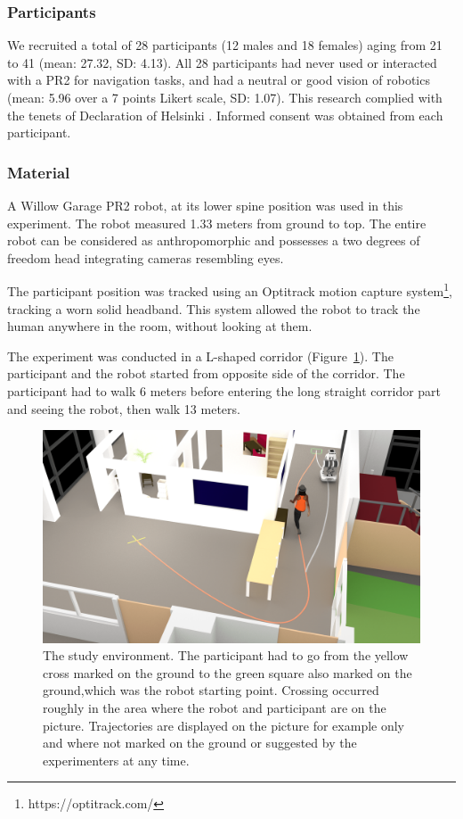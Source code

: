 \documentclass[a4paper,11pt,twoside]{StyleThese}
\begin{document}
\subsubsection{Participants}
We recruited a total of 28 participants (12 males and 18 females) aging from 21 to 41 (mean: 27.32, SD: 4.13). All 28 participants had never used or interacted with a PR2 for navigation tasks, and had a neutral or good vision of robotics (mean: 5.96 over a 7 points Likert scale, SD: 1.07). This research complied with the tenets of Declaration of Helsinki \cite{world2013world}. Informed consent was obtained from each participant.

\subsubsection{Material}
A Willow Garage PR2 robot, at its lower spine position was used in this experiment. The robot measured 1.33 meters from ground to top. The entire robot can be considered as anthropomorphic and possesses a two degrees of freedom head integrating cameras resembling eyes.

The participant position was tracked using an Optitrack motion capture system\footnote{https://optitrack.com/}, tracking a worn solid headband. This system allowed the robot to track the human anywhere in the room, without looking at them.

The experiment was conducted in a L-shaped corridor (Figure~\ref{fig:experiment_adream}). The participant and the robot started from opposite side of the corridor. The participant had to walk 6 meters before entering the long straight corridor part and seeing the robot, then walk 13 meters.

\begin{figure}[hbtp]
\centering
\includegraphics[width=\textwidth]{figures/chapter2/expe_human-min.png}
\caption{The  study  environment.  The  participant  had  to  go  from  the  yellow  cross  marked  on  the  ground  to  the  green  square  also  marked  on  the  ground,which was the robot starting point. Crossing occurred roughly in the area where the robot and participant are on the picture. Trajectories are displayed on the picture for example only and where not marked on the ground or suggested by the experimenters at any time.}
\label{fig:experiment_adream}
\end{figure}
\end{document}
